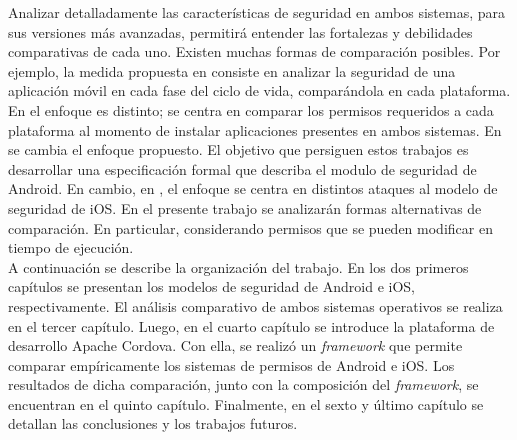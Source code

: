 Analizar detalladamente las características de seguridad en ambos sistemas, para sus versiones más avanzadas, permitirá entender las fortalezas y debilidades comparativas de cada uno. Existen muchas formas de comparación posibles. Por ejemplo, la medida propuesta en \cite{YA2014} consiste en analizar la seguridad de una aplicación móvil en cada fase del ciclo de vida, comparándola en cada plataforma. En \cite{HYGZD2014} el enfoque es distinto; se centra en comparar los permisos requeridos a cada plataforma al momento de instalar aplicaciones presentes en ambos sistemas. En \cite{Gor16, BCLR15, Rom14} se cambia el enfoque propuesto. El objetivo que persiguen estos trabajos es desarrollar una especificación formal que describa el modulo de seguridad de Android. En cambio, en \cite{TZSH13}, el enfoque se centra en distintos ataques al modelo de seguridad de iOS. En el presente trabajo se analizarán formas alternativas de comparación. En particular, considerando permisos que se pueden modificar en tiempo de ejecución.\\

A continuación se describe la organización del trabajo. En los dos primeros capítulos se presentan los modelos de seguridad de Android e iOS, respectivamente. El análisis comparativo de ambos sistemas operativos se realiza en el tercer capítulo. Luego, en el cuarto capítulo se introduce la plataforma de desarrollo Apache Cordova. Con ella, se realizó un \emph{framework} que permite comparar empíricamente los sistemas de permisos de Android e iOS. Los resultados de dicha comparación, junto con la composición del \emph{framework}, se encuentran en el quinto capítulo. Finalmente, en el sexto y último capítulo se detallan las conclusiones y los trabajos futuros.